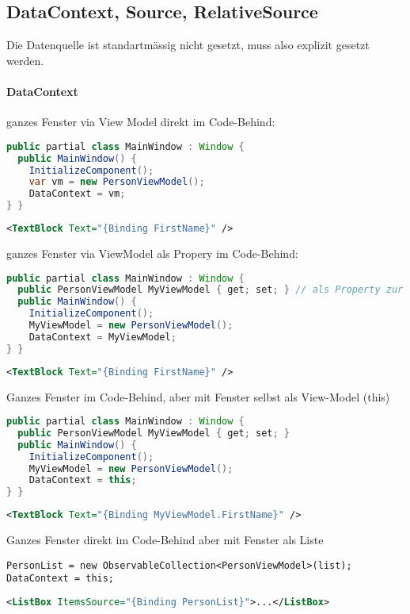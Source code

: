 \subsection{DataContext, Source, RelativeSource}
Die Datenquelle ist standartmässig nicht gesetzt, muss also explizit gesetzt werden. 

\paragraph{DataContext}
ganzes Fenster via View Model direkt im Code-Behind:
\begin{lstlisting}[language=java]
public partial class MainWindow : Window {
  public MainWindow() {
    InitializeComponent();
    var vm = new PersonViewModel();
    DataContext = vm; 
} }
\end{lstlisting}

\begin{lstlisting}[language=xml]
<TextBlock Text="{Binding FirstName}" />
\end{lstlisting}

ganzes Fenster via ViewModel als Propery im Code-Behind:
\begin{lstlisting}[language=java]
public partial class MainWindow : Window {
  public PersonViewModel MyViewModel { get; set; } // als Property zur Verfügung gestellt
  public MainWindow() {
    InitializeComponent();
    MyViewModel = new PersonViewModel();
    DataContext = MyViewModel;        
} }
\end{lstlisting}

\begin{lstlisting}[language=xml]
<TextBlock Text="{Binding FirstName}" />
\end{lstlisting}

Ganzes Fenster im Code-Behind, aber mit Fenster selbst als View-Model (this)
\begin{lstlisting}[language=java]
public partial class MainWindow : Window { 
  public PersonViewModel MyViewModel { get; set; }
  public MainWindow() {
    InitializeComponent(); 
    MyViewModel = new PersonViewModel();
    DataContext = this;
} }
\end{lstlisting}

\begin{lstlisting}[language=xml]
<TextBlock Text="{Binding MyViewModel.FirstName}" />
\end{lstlisting}

Ganzes Fenster direkt im Code-Behind aber mit Fenster als Liste
\begin{lstlisting}[language=sharpc]
PersonList = new ObservableCollection<PersonViewModel>(list); 
DataContext = this; 
\end{lstlisting}
\begin{lstlisting}[language=xml]
<ListBox ItemsSource="{Binding PersonList}">...</ListBox>
\end{lstlisting}

